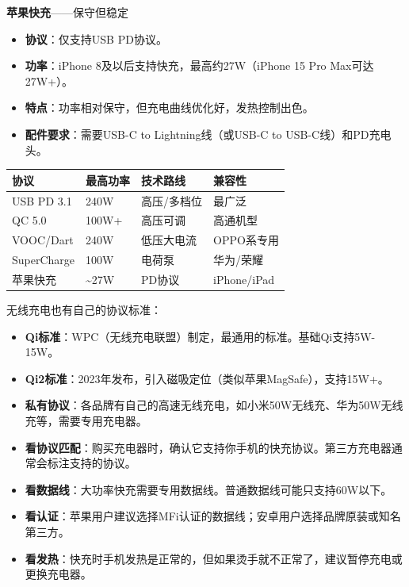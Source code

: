 \textbf{苹果快充}——保守但稳定

\begin{itemize}
  \item \textbf{协议}：仅支持USB PD协议。
  \item \textbf{功率}：iPhone 8及以后支持快充，最高约27W（iPhone 15 Pro Max可达27W+）。
  \item \textbf{特点}：功率相对保守，但充电曲线优化好，发热控制出色。
  \item \textbf{配件要求}：需要USB-C to Lightning线（或USB-C to USB-C线）和PD充电头。
\end{itemize}


\begin{center}
\begin{tabularx}{\linewidth}{|X|X|X|X|}
\hline
\textbf{协议} & \textbf{最高功率} & \textbf{技术路线} & \textbf{兼容性} \tabularnewline
\hline
USB PD 3.1 & 240W & 高压/多档位 & 最广泛 \tabularnewline
QC 5.0 & 100W+ & 高压可调 & 高通机型 \tabularnewline
VOOC/Dart & 240W & 低压大电流 & OPPO系专用 \tabularnewline
SuperCharge & 100W & 电荷泵 & 华为/荣耀 \tabularnewline
苹果快充 & \textasciitilde{}27W & PD协议 & iPhone/iPad \tabularnewline
\hline
\end{tabularx}
\end{center}


无线充电也有自己的协议标准：

\begin{itemize}
  \item \textbf{Qi标准}：WPC（无线充电联盟）制定，最通用的标准。基础Qi支持5W-15W。
  \item \textbf{Qi2标准}：2023年发布，引入磁吸定位（类似苹果MagSafe），支持15W+。
  \item \textbf{私有协议}：各品牌有自己的高速无线充电，如小米50W无线充、华为50W无线充等，需要专用充电器。
\end{itemize}


\begin{itemize}
  \item \textbf{看协议匹配}：购买充电器时，确认它支持你手机的快充协议。第三方充电器通常会标注支持的协议。
  \item \textbf{看数据线}：大功率快充需要专用数据线。普通数据线可能只支持60W以下。
  \item \textbf{看认证}：苹果用户建议选择MFi认证的数据线；安卓用户选择品牌原装或知名第三方。
  \item \textbf{看发热}：快充时手机发热是正常的，但如果烫手就不正常了，建议暂停充电或更换充电器。
\end{itemize}

